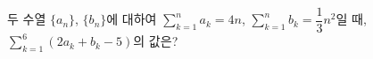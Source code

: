 두 수열 $\{a_n\}$, $\{b_n\}$에 대하여 $\displaystyle\sum_{k=1}^{n} a_k=4n$, $\displaystyle\sum_{k=1}^{n} b_k=\dfrac{1}{3}n^2$일 때, $\displaystyle\sum_{k=1}^{6} (2a_k+b_k-5)$의 값은?
